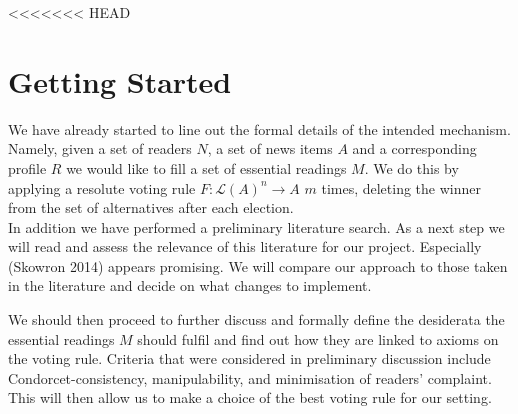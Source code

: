 \documentclass[10pt,a4paper]{article}
\begin{document}
<<<<<<< HEAD
\section{Getting Started}

We have already started to line out the formal details of the intended mechanism. Namely, given a set of readers $N$, a set of news items $A$ and a corresponding profile $R$ we would like to fill a set of essential readings $M$. We do this by applying a resolute voting rule $F:\mathcal{L}(A)^n \rightarrow A$ $m$ times, deleting the winner from the set of alternatives after each election.\\

In addition we have performed a preliminary literature search. As a next step we will read and assess the relevance of this literature for our project. Especially (Skowron 2014) appears promising. We will compare our approach to those taken in the literature and decide on what changes to implement.

We should then proceed to further discuss and formally define the desiderata the essential readings $M$ should fulfil and find out how they are linked to axioms on the voting rule. Criteria that were considered in preliminary discussion include Condorcet-consistency, manipulability, and minimisation of readers' complaint. This will then allow us to make a choice of the best voting rule for our setting.
\end{document}
